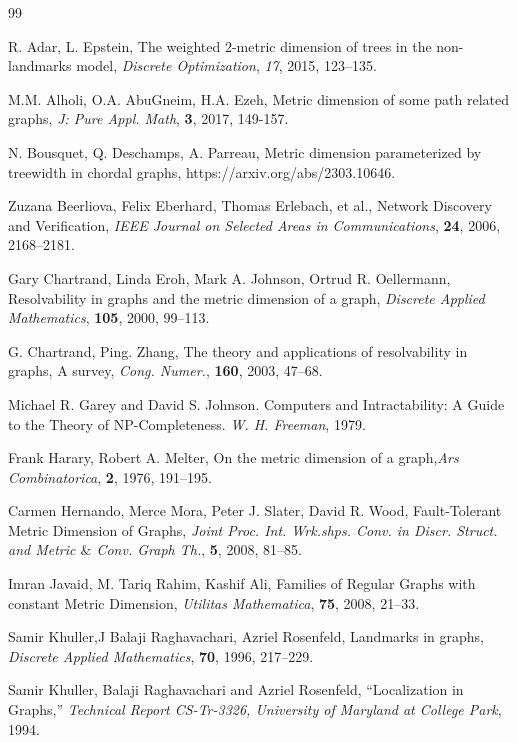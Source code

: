 \documentclass{article}
\theoremstyle{definition}
\numberwithin{equation}{section}
\begin{document}
\begin{thebibliography}{99}

R. Adar, L. Epstein, The weighted $2$-metric dimension of trees in the non-landmarks model, \textit{Discrete  Optimization}, \textit{17}, 2015, 123--135.

M.M. Alholi, O.A. AbuGneim, H.A. Ezeh, Metric dimension of some path
related graphs, \textit{J: Pure Appl. Math}, \textbf{3}, 2017, 149-157.

N. Bousquet, Q. Deschamps, A. Parreau, Metric dimension parameterized by treewidth in chordal graphs, https://arxiv.org/abs/2303.10646.


Zuzana Beerliova, Felix Eberhard, Thomas Erlebach, et al., Network Discovery and Verification, \textit{IEEE Journal on Selected Areas in
Communications}, \textbf{24}, 2006, 2168–2181.


Gary Chartrand, Linda Eroh, Mark A. Johnson, Ortrud R. Oellermann, 
Resolvability in graphs and the metric dimension of a graph, \textit{Discrete Applied Mathematics}, \textbf{105}, 2000, 99–113.


G. Chartrand, Ping. Zhang, The theory and applications of resolvability in graphs, A survey, \textit{Cong. Numer.}, \textbf{160}, 2003, 47--68. 


Michael R. Garey and David S. Johnson. Computers and Intractability: A Guide to the Theory of NP-Completeness. \textit{ W. H. Freeman}, 1979.

Frank Harary, Robert A. Melter, On the metric dimension of a graph,\textit{Ars Combinatorica}, \textbf{2}, 1976, 191--195.

Carmen Hernando, Merce Mora, Peter J. Slater, David R. Wood, Fault-Tolerant Metric Dimension of Graphs, \textit{Joint Proc. Int. Wrk.shps. Conv. in 
Discr. Struct. and Metric $\&$ Conv. Graph Th.}, \textbf{5}, 2008, 81--85. 


Imran Javaid, M. Tariq Rahim, Kashif Ali, Families of Regular Graphs with constant Metric Dimension, \textit{Utilitas Mathematica}, \textbf{75}, 2008, 21--33.


Samir Khuller,J Balaji Raghavachari, Azriel Rosenfeld, Landmarks in graphs,
\textit{Discrete Applied Mathematics}, \textbf{70}, 1996, 217--229.  

Samir Khuller, Balaji Raghavachari and Azriel Rosenfeld, “Localization in Graphs,” \textit{Technical Report CS-Tr-3326, University of Maryland at College Park}, 1994.


\end{thebibliography}
\end{document}
